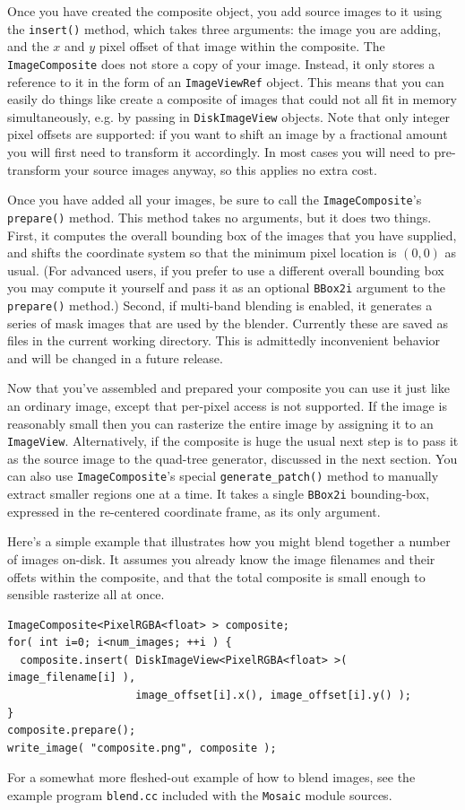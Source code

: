 Once you have created the composite object, you add source images to
it using the \verb#insert()# method, which takes three arguments: the
image you are adding, and the $x$ and $y$ pixel offset of that image
within the composite.  The \verb#ImageComposite# does not store a copy
of your image.  Instead, it only stores a reference to it in the form
of an \verb#ImageViewRef# object.  This means that you can easily do
things like create a composite of images that could not all fit in
memory simultaneously, e.g. by passing in \verb#DiskImageView#
objects.  Note that only integer pixel offsets are supported: if you
want to shift an image by a fractional amount you will first need to
transform it accordingly.  In most cases you will need to
pre-transform your source images anyway, so this applies no extra
cost.  

Once you have added all your images, be sure to call the
\verb#ImageComposite#'s \verb#prepare()# method.  This method takes no
arguments, but it does two things.  First, it computes the overall
bounding box of the images that you have supplied, and shifts the
coordinate system so that the minimum pixel location is $(0,0)$ as
usual.  (For advanced users, if you prefer to use a different overall
bounding box you may compute it yourself and pass it as an optional
\verb#BBox2i# argument to the \verb#prepare()# method.)  Second, if
multi-band blending is enabled, it generates a series of mask images
that are used by the blender.  Currently these are saved as files in
the current working directory.  This is admittedly inconvenient
behavior and will be changed in a future release.

Now that you've assembled and prepared your composite you can use 
it just like an ordinary image, except that per-pixel access is 
not supported.  If the image is reasonably small then you can 
rasterize the entire image by assigning it to an \verb#ImageView#. 
Alternatively, if the composite is huge the usual next step is to 
pass it as the source image to the quad-tree generator, discussed 
in the next section.  You can also use \verb#ImageComposite#'s 
special \verb#generate_patch()# method to manually extract smaller 
regions one at a time.  It takes a single \verb#BBox2i# bounding-box, 
expressed in the re-centered coordinate frame, as its only argument.

Here's a simple example that illustrates how you might blend 
together a number of images on-disk.  It assumes you already know 
the image filenames and their offets within the composite, and 
that the total composite is small enough to sensible rasterize all 
at once.
\begin{verbatim}
ImageComposite<PixelRGBA<float> > composite;
for( int i=0; i<num_images; ++i ) {
  composite.insert( DiskImageView<PixelRGBA<float> >( image_filename[i] ),
                    image_offset[i].x(), image_offset[i].y() );
}
composite.prepare();
write_image( "composite.png", composite );
\end{verbatim}
For a somewhat more fleshed-out example of how to blend images, 
see the example program \verb#blend.cc# included with the 
\verb#Mosaic# module sources.

